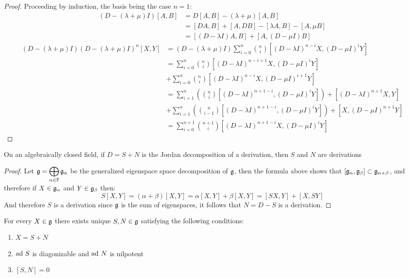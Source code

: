 \begin{proof}
	Proceeding by induction, the basis being the case $n=1$: 
	\begin{align*}
	(D-(\lambda+\mu)I)[A,B] &= D[A,B] - (\lambda + \mu)[A,B] \\ 
	&= [DA,B] + [A,DB] - [\lambda A,B] - [A,\mu B]\\
	&= [(D-\lambda I)A,B] + [A,(D-\mu I)B] 
	\end{align*}
	\begin{align*}
	(D-(\lambda + \mu)I)
	(D-(\lambda+\mu)I)^n[X,Y] &= (D-(\lambda+\mu)I)\sum_{i=0}^n {n \choose i}[(D-\lambda I)^{n-i}X,(D-\mu I)^iY]\\
	&=\sum_{i=0}^n {n\choose i}[(D-\lambda I)^{n-i+1}X,(D-\mu I)^i Y]\\
	&+\sum_{i=0}^n {n \choose i}[(D-\lambda I)^{n-i}X,(D-\mu I)^{i+1}Y]\\
	&=\sum_{i=1}^{n} \left({n \choose {i}}[(D-\lambda I)^{n+1-i},(D-\mu I )^i Y]\right) + [(D-\lambda I)^{n+1}X,Y]\\
	&+\sum_{i=1}^{n}\left({n \choose i-1}[(D- \lambda I)^{n+1-i},(D-\mu I)^i Y] \right) + [X,(D- \mu I)^{n+1}Y]\\
	&= \sum_{i=0}^{n+1}{{n+1}\choose i}[(D-\lambda I)^{n+1-i}X,(D-\mu I)^i Y]
	\end{align*}
\end{proof}
\begin{corol}
	On an algebraically closed field, if $D=S+N$ is the Jordan decomposition of a derivation, then $S$ and $N$ are derivations
\end{corol}
\begin{proof}
	Let $\mathfrak{g} = \displaystyle\bigoplus_{\alpha \in \mathbb{F}} \mathfrak{g}_\alpha$ be the generalized eigenspace space decomposition of $\mathfrak{g}$, then the formula above shows that $[\mathfrak{g}_\alpha,\mathfrak{g}_\beta] \subset \mathfrak{g}_{\alpha+\beta}$, and therefore if $X \in \mathfrak{g}_\alpha$ and $Y \in \mathfrak{g}_\beta$ then:
	$$S[X,Y] = (\alpha+\beta)[X,Y] = \alpha[X,Y]+\beta[X,Y] = [SX,Y]+[X,SY]$$
	And therefore $S$ is a derivation since $\mathfrak{g}$ is the sum of eigenspaces, it follows that $N=D-S$ is a derivation.
\end{proof}
\begin{prop}
	For every $X \in \mathfrak{g}$ there exists unique $S,N \in \mathfrak{g}$ satisfying the following conditions:
	\begin{enumerate}[label=\Alph*.]
		\item $X=S+N$
		\item $\text{ad}\  S$ is diagonizable and $\text{ad}\  N$ is nilpotent
		\item $[S,N]=0$
	\end{enumerate}
	\label{AbsJordanDecomp}
\end{prop}
